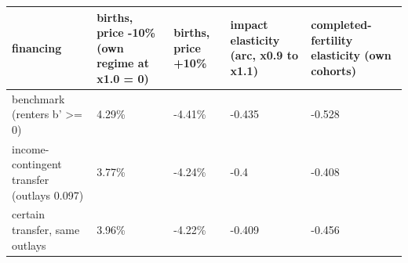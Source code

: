\begingroup\small
\setlength{\tabcolsep}{3pt}
\renewcommand{\arraystretch}{1.04}
\begin{tabularx}{\linewidth}{XXXXX}
\toprule
financing & births, price -10\% (own regime at x1.0 = 0) & births, price +10\% & impact elasticity (arc, x0.9 to x1.1) & completed-fertility elasticity (own cohorts) \\
\midrule
benchmark (renters b' \textgreater{}= 0) & 4.29\% & -4.41\% & -0.435 & -0.528 \\
income-contingent transfer (outlays 0.097) & 3.77\% & -4.24\% & -0.4 & -0.408 \\
certain transfer, same outlays & 3.96\% & -4.22\% & -0.409 & -0.456 \\
\bottomrule
\end{tabularx}
\endgroup
